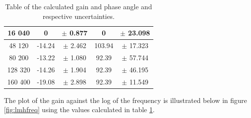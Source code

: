 \documentclass[12pt]{article}
\begin{document}
\begin{table}[H]
{\begin{tabular}{|c|c|c|c|c|}
        16 040                                                   & 0                                                                     & $\pm$ 0.877                                                                  & 0                                                                 & $\pm$ 23.098                                                             \\ \hline
        48 120                                                   & -14.24                                                                & $\pm$ 2.462                                                                  & 103.94                                                            & $\pm$ 17.323                                                             \\ \hline
        80 200                                                   & -13.22                                                                & $\pm$ 1.080                                                                  & 92.39                                                             & $\pm$ 57.744                                                             \\ \hline
        128 320                                                  & -14.26                                                                & $\pm$ 1.904                                                                  & 92.39                                                             & $\pm$ 46.195                                                             \\ \hline
        160 400                                                  & -19.08                                                                & $\pm$ 2.898                                                                  & 92.39                                                             & $\pm$ 11.549                                                             \\ \hline
        \end{tabular}
    
    }

    \caption{\centering Table of the calculated gain and phase angle and respective uncertainties.}
    \label{tab:2}

\end{table}

The plot of the gain against the log of the frequency is illustrated below in figure \ref{fig:lmhfreq} using the values calculated in table \ref{tab:2}.
\end{document}
